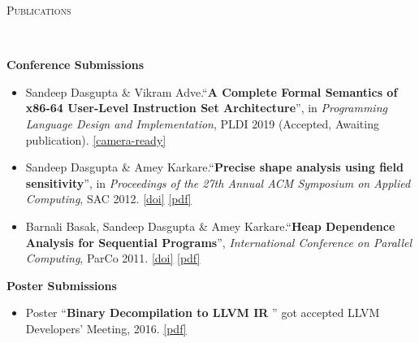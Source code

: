 \documentclass[9pt]{article}
\newenvironment{changemargin}[2]{%
  \begin{list}{}{%
    \setlength{\topsep}{0pt}%
    \setlength{\leftmargin}{#1}%
    \setlength{\rightmargin}{#2}%
    \setlength{\listparindent}{\parindent}%
    \setlength{\itemindent}{\parindent}%
    \setlength{\parsep}{\parskip}%
  }%
  \item[]}{\end{list}
}
\newcommand{\lineover}{
	\begin{changemargin}{-0.05in}{-0.05in}
		\vspace*{-8pt}
		\hrulefill \\
		\vspace*{-2pt}
	\end{changemargin}
}
\newcommand{\header}[1]{
	\begin{changemargin}{-0.5in}{-0.5in}
		\scshape{#1}\\
  	\lineover
	\end{changemargin}
}
\newcommand{\cmnt}[1]{}
\newenvironment{body} {
	\vspace*{-16pt}
	\begin{changemargin}{-0.25in}{-0.5in}
  }	
	{\end{changemargin}
}
\begin{document}
\smallskip

\header{Publications}
\begin{body}
\vspace{14pt}
\textbf{Conference Submissions}\\
	\vspace*{-4pt}
	\begin{itemize} \itemsep -0pt
		\item Sandeep Dasgupta \& Vikram Adve.``\textbf{A Complete Formal Semantics of x86-64 User-Level
Instruction Set Architecture}'', in \emph{Programming Language Design and Implementation}, PLDI 2019 (Accepted, Awaiting publication). 
                \href{http://webhost.engr.illinois.edu/~sdasgup3/Document/pldi2019.pdf}{[camera-ready]} \\
		\item Sandeep Dasgupta \& Amey Karkare.``\textbf{Precise shape analysis using field sensitivity}'', in \emph{Proceedings of the 27th Annual ACM Symposium on Applied Computing}, SAC 2012. 
                \href{http://dx.doi.org/10.1145/2245276.2231982}{[doi]}
                \href{http://webhost.engr.illinois.edu/~sdasgup3/Document/sac_2012.pdf}{[pdf]}\\

		\item Barnali Basak, Sandeep Dasgupta \& Amey Karkare.``\textbf{Heap Dependence Analysis for Sequential Programs}'', \emph{International Conference on Parallel Computing}, ParCo 2011. 
                \href{http://dx.doi.org/10.3233/978-1-61499-041-3-99}{[doi]}
                \href{http://webhost.engr.illinois.edu/~sdasgup3/Document/parco_2011.pdf}{[pdf]} \\
                  \cmnt{
		\begin{itemize} \itemsep -0pt
			\item Published in: Applications, Tools and Techniques on the Road to Exascale Computing, 22 volume of Advances in 
				Parallel Computing, chapter: Heap Dependence Analysis for Sequential Programs, pages 99--106. IOS Press, May 2012. 
				doi: \href{http://dx.doi.org/10.3233/978-1-61499-041-3-99}{10.3233/978-1-61499-041-3-99}, isbn: 978-1-61499-040-6.
		\end{itemize}
                  }
	\end{itemize}

\textbf{Poster Submissions}\\
	\vspace*{-4pt}
	\begin{itemize} \itemsep -0pt
                \item Poster ``\textbf{Binary Decompilation to LLVM IR
                  }'' got accepted LLVM Developers' Meeting, 2016.
                  \href{https://www.dropbox.com/s/8s20r8pi3eu4knw/allin_poster.pdf?dl=0}{[pdf]}


\end{itemize}
\end{body}
\end{document}
